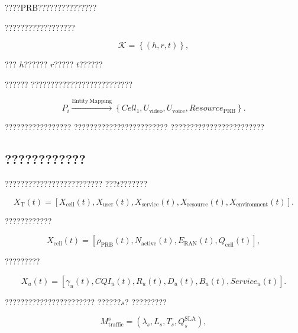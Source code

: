 ????PRB???????????????

??????????????????

\begin{equation}
\mathcal{K}
=
\left\{
\left(
h,r,t
\right)
\right\},
\label{eq:knowledge_graph_triples}
\end{equation}

???
$h$??????
$r$?????
$t$??????

??????
??????????????????????????

\begin{equation}
P_i
\xrightarrow{\mathrm{Entity\ Mapping}}
\left\{
Cell_1,
U_{\mathrm{video}},
U_{\mathrm{voice}},
Resource_{\mathrm{PRB}}
\right\}.
\label{eq:policy_entity_mapping}
\end{equation}

?????????????????
????????????????????????
????????????????????????


\subsection*{????????????}

?????????????????????????
???$t$???????

\begin{equation}
X_{\mathrm{T}}(t)
=
\left[
X_{\mathrm{cell}}(t),
X_{\mathrm{user}}(t),
X_{\mathrm{service}}(t),
X_{\mathrm{resource}}(t),
X_{\mathrm{environment}}(t)
\right].
\label{eq:twin_state_vector}
\end{equation}

????????????

\begin{equation}
X_{\mathrm{cell}}(t)
=
\left[
\rho_{\mathrm{PRB}}(t),
N_{\mathrm{active}}(t),
E_{\mathrm{RAN}}(t),
Q_{\mathrm{cell}}(t)
\right],
\label{eq:cell_state_model}
\end{equation}

?????????

\begin{equation}
X_u(t)
=
\left[
\gamma_u(t),
CQI_u(t),
R_u(t),
D_u(t),
B_u(t),
Service_u(t)
\right].
\label{eq:user_state_model}
\end{equation}

???????????????????????
??????$s$?
?????????

\begin{equation}
M_{\mathrm{traffic}}^{s}
=
\left(
\lambda_s,
L_s,
T_s,
Q_s^{\mathrm{SLA}}
\right),
\label{eq:traffic_model}
\end{equation}

